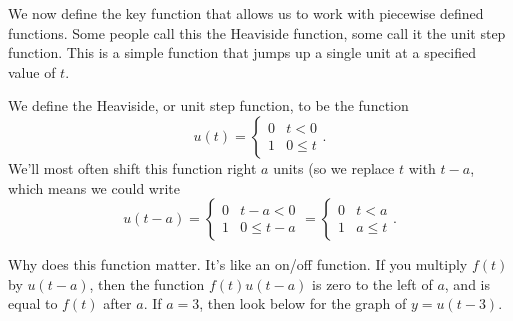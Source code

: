 We now define the key function that allows us to work with piecewise defined functions.  Some people call this the Heaviside function, some call it the unit step function. This is a simple function that jumps up a single unit at a specified value of $t$. 
\begin{definition}
We define the Heaviside, or unit step function, to be the function
$$u(t) = \begin{cases}0 &t<0 \\ 1 &0\leq t\end{cases}.$$ 
We'll most often shift this function right $a$ units (so we replace $t$ with $t-a$, which means we could write
$$u(t-a) = \begin{cases}0 &t-a<0 \\ 1 &0\leq t-a\end{cases}= \begin{cases}0 &t<a \\ 1 &a\leq t\end{cases}.$$ 
\end{definition}
Why does this function matter.  It's like an on/off function.  If you multiply $f(t)$ by $u(t-a)$, then the function $f(t)u(t-a)$ is zero to the left of $a$, and is equal to $f(t)$ after $a$. If $a=3$, then look below for the graph of $y=u(t-3)$.
\begin{center}
\end{center}
  

